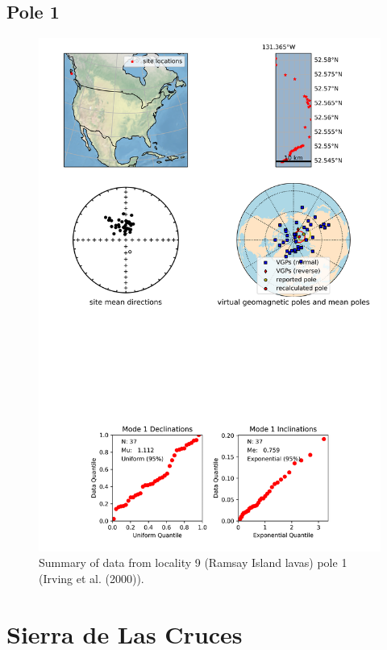 \documentclass{article}
\begin{document}
\subsection{Pole 1}


\begin{figure}[H]
\centering
\includegraphics[width=5 in]{./9/1/pole_summary.png}
\caption{Summary of data from locality 9 (Ramsay Island lavas) pole 1 (Irving et al. (2000)).}
\end{figure}

\section{Sierra de Las Cruces}
\end{document}
